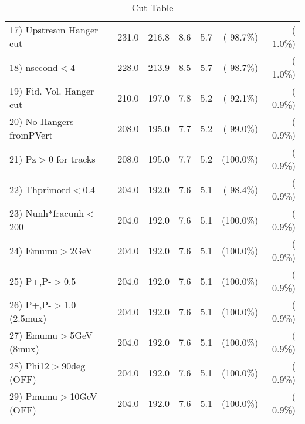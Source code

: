 \begin{table}[h!]
\begin{tabular}{||l||r|r|r|r|r|r||}
 17) Upstream Hanger cut  &        231.0 &        216.8 &          8.6 &          5.7 & ( 98.7\%) & (  1.0\%) \\
 18) nsecond$<$4          &        228.0 &        213.9 &          8.5 &          5.7 & ( 98.7\%) & (  1.0\%) \\
 19) Fid. Vol. Hanger cut &        210.0 &        197.0 &          7.8 &          5.2 & ( 92.1\%) & (  0.9\%) \\
 20) No Hangers fromPVert &        208.0 &        195.0 &          7.7 &          5.2 & ( 99.0\%) & (  0.9\%) \\
 21) Pz$>$0 for tracks    &        208.0 &        195.0 &          7.7 &          5.2 & (100.0\%) & (  0.9\%) \\
 22) Thprimord$<$0.4      &        204.0 &        192.0 &          7.6 &          5.1 & ( 98.4\%) & (  0.9\%) \\
 23) Nunh*fracunh$<$200   &        204.0 &        192.0 &          7.6 &          5.1 & (100.0\%) & (  0.9\%) \\
 24) Emumu$>$2GeV         &        204.0 &        192.0 &          7.6 &          5.1 & (100.0\%) & (  0.9\%) \\
 25) P+,P-$>$0.5          &        204.0 &        192.0 &          7.6 &          5.1 & (100.0\%) & (  0.9\%) \\
 26) P+,P-$>$1.0 (2.5mux) &        204.0 &        192.0 &          7.6 &          5.1 & (100.0\%) & (  0.9\%) \\
 27) Emumu$>$5GeV  (8mux) &        204.0 &        192.0 &          7.6 &          5.1 & (100.0\%) & (  0.9\%) \\
 28) Phi12$>$90deg  (OFF) &        204.0 &        192.0 &          7.6 &          5.1 & (100.0\%) & (  0.9\%) \\
 29) Pmumu$>$10GeV  (OFF) &        204.0 &        192.0 &          7.6 &          5.1 & (100.0\%) & (  0.9\%) \\
 \hline
 \hline
 \end{tabular}
 \caption{Cut Table           }
 \label{tab-cutcohjpsi-mumu_cohrho0}
 \end{table}
